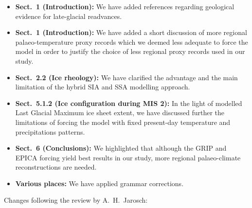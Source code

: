 \begin{itemize}

    \item \textbf{Sect.~1 (Introduction):}
    We have added references regarding geological evidence for late-glacial
    readvances.

    \item \textbf{Sect.~1 (Introduction):}
    We have added a short discussion of more regional palaeo-temperature proxy
    records which we deemed less adequate to force the model in order to
    justify the choice of less regional proxy records used in our study.

    \item \textbf{Sect.~2.2 (Ice rheology):}
    We have clarified the advantage and the main limitation of the hybrid SIA
    and SSA modelling approach.

    \item \textbf{Sect.~5.1.2 (Ice configuration during MIS 2):}
    In the light of modelled Last Glacial Maximum ice sheet extent, we have
    discussed further the limitations of forcing the model with fixed
    present-day temperature and precipitations patterns.

    \item \textbf{Sect.~6 (Conclusions):}
    We highlighted that although the GRIP and EPICA forcing yield best results
    in our study, more regional palaeo-climate reconstructions are needed.

    \item \textbf{Various places:}
    We have applied grammar corrections.

\end{itemize}

\bigskip

Changes following the review by A.~H.~Jarosch:

